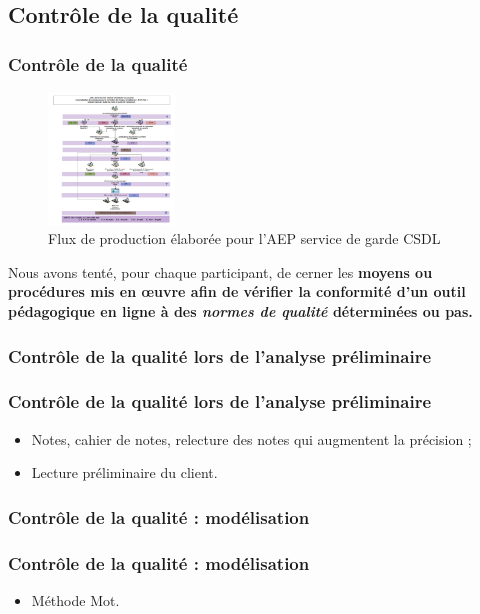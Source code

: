 				\subsection{Contrôle de la qualité} 
						\begin{frame}[allowframebreaks]
						\frametitle{Contrôle de la qualité}
                        			\begin{figure}
                     			\centering
                    			 \includegraphics[width = 0.30\textwidth]{flux.png}
                     			\caption{\tiny{Flux de production élaborée pour l'AEP service de garde CSDL}}
                   			\end{figure}
                        			Nous avons tenté, pour chaque participant, de cerner les \textbf{moyens ou procédures mis en œuvre afin de vérifier la conformité d’un outil pédagogique en ligne à des \textit{normes de qualité} déterminées ou pas.}
						
						\end{frame}
						
					\subsubsection{Contrôle de la qualité lors de l'analyse préliminaire} 
							\begin{frame}
							\frametitle{Contrôle de la qualité lors de l'analyse préliminaire}
                        				
							\begin{itemize}
							
							\item Notes, cahier de notes, relecture des notes qui augmentent la précision ;
							\item Lecture préliminaire du client. 
												
							\end{itemize}						
					\end{frame}	
					\subsubsection{Contrôle de la qualité : modélisation} 
							\begin{frame}[allowframebreaks]
							\frametitle{Contrôle de la qualité : modélisation}
                        			
							\begin{itemize}
							\item Méthode Mot.
							\end{itemize}						
					\end{frame}	
					
